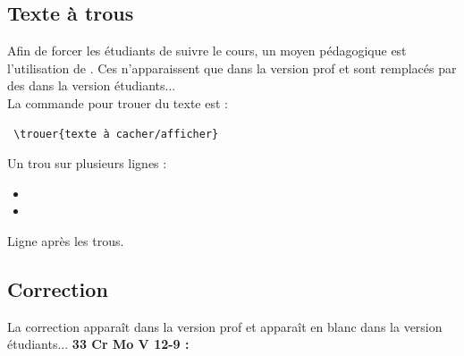 \documentclass[b,e,cours]{D:/Dropbox/enseignement/CPGE/raphaelpoiree/paquets/classe_kara}
\begin{document}
\subsection{Texte à trous}

\begin{frame}[fragile]
Afin de forcer les étudiants de suivre le cours, un moyen pédagogique est l'utilisation de . Ces  n'apparaissent que dans la version prof et sont remplacés par des  dans la version étudiants...\\
La commande pour trouer du texte est : \begin{verbatim} \trouer{texte à cacher/afficher} \end{verbatim}


Un trou sur plusieurs lignes :

\begin{itemize}
\item {}
\item {}
\end{itemize}



Ligne après les trous.

\end{frame}

\subsection{Correction}
\begin{frame}[fragile]

La correction apparaît dans la version prof et apparaît en blanc dans la version étudiants...\newline
\textbf{33 Cr Mo V 12-9 : } \\
\end{frame}

\end{document}
